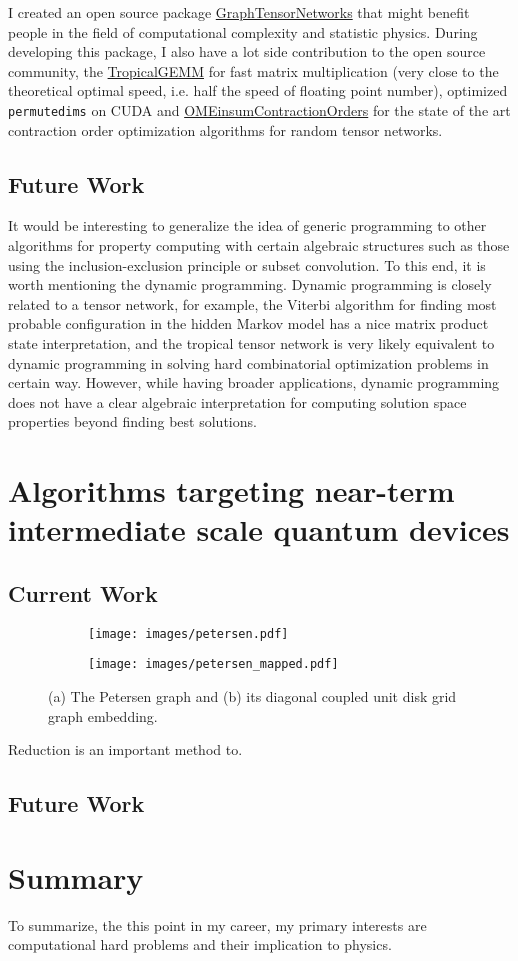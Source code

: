 \documentclass[a4paper]{article}
\newcommand{\<}{\langle}
\renewcommand{\>}{\rangle}
\begin{document}
I created an open source package \href{}{GraphTensorNetworks} that might benefit people in the field of computational complexity and statistic physics.
During developing this package, I also have a lot side contribution to the open source community, the \href{}{TropicalGEMM} for fast matrix multiplication (very close to the theoretical optimal speed, i.e. half the speed of floating point number), optimized \texttt{permutedims} on CUDA and \href{}{OMEinsumContractionOrders} for the state of the art contraction order optimization algorithms for random tensor networks.

\subsection{Future Work}
It would be interesting to generalize the idea of generic programming to other algorithms for property computing with certain algebraic structures such as those using the inclusion-exclusion principle or subset convolution.
To this end, it is worth mentioning the dynamic programming.
Dynamic programming is closely related to a tensor network, for example, the Viterbi algorithm for finding most probable configuration in the hidden Markov model has a nice matrix product state interpretation, and the tropical tensor network is very likely equivalent to dynamic programming in solving hard combinatorial optimization problems in certain way.
However, while having broader applications,
dynamic programming does not have a clear algebraic interpretation for computing solution space properties beyond finding best solutions.

\section{Algorithms targeting near-term intermediate scale quantum devices}
\subsection{Current Work}

\begin{figure}
\centering
\begin{subfigure}[b]{0.25\textwidth}
\texttt{[image: images/petersen.pdf]}
\caption{}
\end{subfigure}\hspace{20pt}
\begin{subfigure}[b]{0.6\textwidth}
\texttt{[image: images/petersen\_mapped.pdf]}
\caption{}
\end{subfigure}
\caption{(a) The Petersen graph and (b) its diagonal coupled unit disk grid graph embedding.}\label{fig:petersen}
\end{figure}

Reduction is an important method to.
\subsection{Future Work}

\section{Summary}
To summarize, the this point in my career, my primary interests are computational hard problems and their implication to physics.
\end{document}
